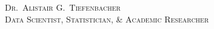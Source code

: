 \documentclass[a4paper, oneside, final, 10pt]{scrartcl}
\begin{document}
{\centering
{\huge \textsc{Dr.~Alistair G.~Tiefenbacher}}\\
\textsc{Data Scientist, Statistician, \& Academic Researcher}
\vspace{0.2cm}
\par}


\vfill


% 

\vfill


\vfill


%

%

%

\vfill


% 

\vfill


\vfill
\end{document}
